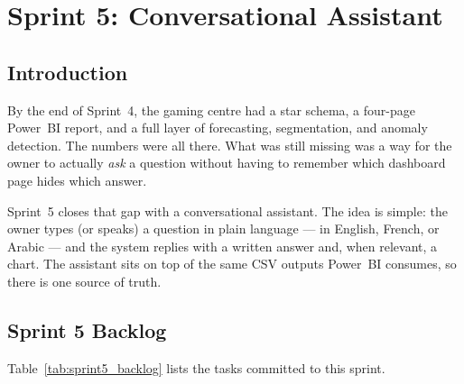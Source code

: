\chapter{Sprint 5: Conversational Assistant}

\section{Introduction}

By the end of Sprint~4, the gaming centre had a star schema, a four-page
Power~BI report, and a full layer of forecasting, segmentation, and
anomaly detection. The numbers were all there. What was still missing was
a way for the owner to actually \emph{ask} a question without having to
remember which dashboard page hides which answer.

Sprint~5 closes that gap with a conversational assistant. The idea is
simple: the owner types (or speaks) a question in plain language --- in
English, French, or Arabic --- and the system replies with a written
answer and, when relevant, a chart. The assistant sits on top of the same
CSV outputs Power~BI consumes, so there is one source of truth.

\section{Sprint 5 Backlog}

Table~\ref{tab:sprint5_backlog} lists the tasks committed to this sprint.

